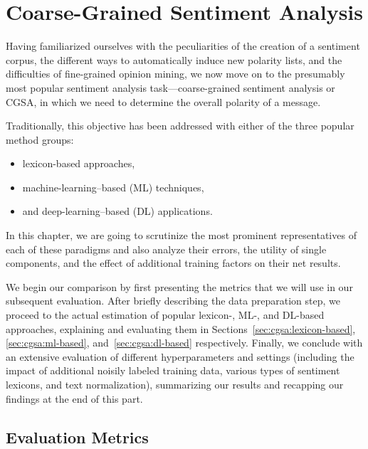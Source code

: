 \chapter{Coarse-Grained Sentiment Analysis}\label{sec:snt:cgsa}

Having familiarized ourselves with the peculiarities of the creation
of a sentiment corpus, the different ways to automatically induce new
polarity lists, and the difficulties of fine-grained opinion mining,
we now move on to the presumably most popular sentiment analysis
task---coarse-grained sentiment analysis or CGSA, in which we need to
determine the overall polarity of a message.

Traditionally, this objective has been addressed with either of the
three popular method groups:
\begin{itemize}
  \item lexicon-based approaches,
  \item machine-learning--based (ML) techniques,
  \item and deep-learning--based (DL) applications.
\end{itemize}
In this chapter, we are going to scrutinize the most prominent
representatives of each of these paradigms and also analyze their
errors, the utility of single components, and the effect of additional
training factors on their net results.


We begin our comparison by first presenting the metrics that we will
use in our subsequent evaluation.  After briefly describing the data
preparation step, we proceed to the actual estimation of popular
lexicon-, ML-, and DL-based approaches, explaining and evaluating them
in Sections~\ref{sec:cgsa:lexicon-based}, \ref{sec:cgsa:ml-based},
and~\ref{sec:cgsa:dl-based} respectively.  Finally, we conclude with
an extensive evaluation of different hyperparameters and settings
(including the impact of additional noisily labeled training data,
various types of sentiment lexicons, and text normalization),
summarizing our results and recapping our findings at the end of this
part.

\section{Evaluation Metrics}\label{sec:cgsa:eval-metrics}

